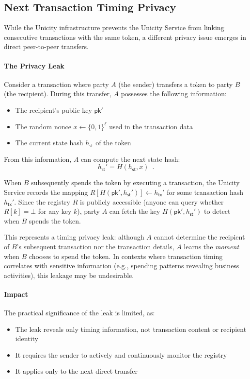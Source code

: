\documentclass{article}
\newcommand{\pubkey}[0]{\mathsf{pk}}
\newcommand{\sthash}[0]{{h_\mathsf{st}}}
\newcommand{\txhash}[0]{{h_\mathsf{tx}}}
\begin{document}
\subsection{Next Transaction Timing Privacy}

While the Unicity infrastructure prevents the Unicity Service from linking consecutive transactions with the same token, a different privacy issue emerges in direct peer-to-peer transfers.

\paragraph{The Privacy Leak}

Consider a transaction where party $A$ (the sender) transfers a token to party $B$ (the recipient). During this transfer, $A$ possesses the following information:
\begin{itemize}
\item The recipient's public key $\pubkey'$
\item The random nonce $x \gets \{0,1\}^\ell$ used in the transaction data
\item The current state hash $\sthash$ of the token
\end{itemize}

\noindent From this information, $A$ can compute the next state hash:
\[
\sthash' = H(\sthash, x) \enspace.
\]

\noindent When $B$ subsequently spends the token by executing a transaction, the Unicity Service records the mapping $R[H(\pubkey', \sthash')] \gets \txhash'$ for some transaction hash $\txhash'$. Since the registry $R$ is publicly accessible (anyone can query whether $R[k] = \bot$ for any key $k$), party $A$ can fetch the key $H(\pubkey', \sthash')$ to detect when $B$ spends the token.

This represents a timing privacy leak: although $A$ cannot determine the recipient of $B$'s subsequent transaction nor the transaction details, $A$ learns the \emph{moment} when $B$ chooses to spend the token. In contexts where transaction timing correlates with sensitive information (e.g., spending patterns revealing business activities), this leakage may be undesirable.

\paragraph{Impact} The practical significance of the leak is limited, as:
\begin{itemize}
\item The leak reveals only timing information, not transaction content or recipient identity
\item It requires the sender to actively and continuously monitor the registry
\item It applies only to the next direct transfer
\end{itemize}
\end{document}
